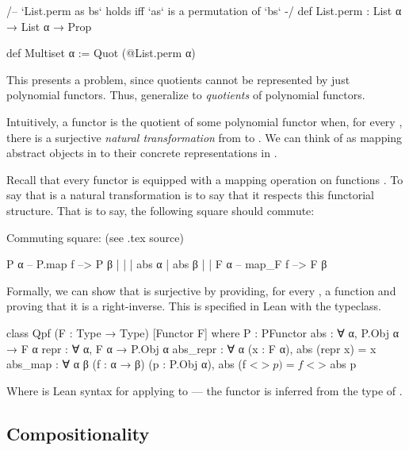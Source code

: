 \begin{leancode}
    /-- `List.perm as bs` holds iff `as` is a permutation of `bs` -/
    def List.perm : List α → List α → Prop

    def Multiset α := Quot (@List.perm α)
\end{leancode}

This presents a problem, since quotients cannot be represented by just polynomial functors. Thus, generalize to \emph{quotients} of polynomial functors.

Intuitively, a functor  is the quotient of some polynomial functor  when, for every , there is a surjective \emph{natural transformation}  from  to . We can think of  as mapping abstract objects in  to their concrete representations in .

Recall that every functor  is equipped with a mapping operation  on functions . To say that  is a natural transformation is to say that it respects this functorial structure. That is to say, the following square should commute:
\begin{todo}
    Commuting square: (see .tex source)

    P α -- P.map f --> P β
     |                  |
     | abs α            | abs β
     |                  |
     \/                 \/
    F α -- map\_F f --> F β 

\end{todo}

Formally, we can show that  is surjective by providing, for every , a function  and proving that it is a right-inverse.
This is specified in Lean with the  typeclass.
\begin{leancode}
  class Qpf (F : Type → Type) [Functor F] where
    P        : PFunctor
    abs      : ∀ {α}, P.Obj α → F α
    repr     : ∀ {α}, F α → P.Obj α
    abs_repr : ∀ {α} (x : F α), abs (repr x) = x
    abs_map  : ∀ {α β} (f : α → β) (p : P.Obj α), 
                    abs (f <$> p) = f <$> abs p
\end{leancode}
Where  is Lean syntax for applying  to  --- the functor  is inferred from the type of .


\subsection*{Compositionality}

